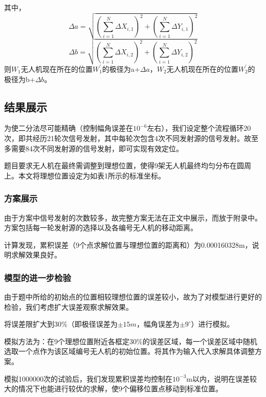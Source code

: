 \documentclass{ctexart}
\begin{document}
其中，
\[
  \Delta a=\sqrt{(\sum_{i=1}^{N}\Delta X_{i,1})^2+(\sum_{i=1}^{N}\Delta Y_{i,1})^2}
\]
\[
  \Delta b=\sqrt{(\sum_{i=1}^{N}\Delta X_{i,2})^2+(\sum_{i=1}^{N}\Delta Y_{i,2})^2}
\]
则$W_1$无人机现在所在的位置$W_1^{'}$的极径为a+$\Delta a$，$W_2$无人机现在所在的位置$W_2^{'}$的极径为b+$\Delta b$。
\subsection{结果展示}
为使二分法尽可能精确（控制幅角误差在$10^{-6}$左右），我们设定整个流程循环20次，即共经历21轮次信号发射，其中每轮次包含4次不同发射源的信号发射。故至多需要84次不同发射源的信号发射，即可实现有效定位。

题目要求无人机在最终需调整到理想位置，使得9架无人机最终均匀分布在圆周上。本文将理想位置设定为如表1所示的标准坐标。
\subsubsection{方案展示}
由于方案中信号发射的次数较多，故完整方案无法在正文中展示，而放于附录中。方案包括每一轮发射源的选择以及各编号无人机的移动距离。

计算发现，累积误差（9个点求解位置与理想位置的距离和）为0.000160328m，说明求解效果良好。

\subsubsection{模型的进一步检验}
由于题中所给的初始点的位置相较理想位置的误差较小，故为了对模型进行更好的检验，我们考虑扩大误差观察求解效果。

将误差限扩大到30\%（即极径误差为$\pm 15m $，幅角误差为$\pm 9^{\circ}$）进行模拟。

模拟方法为：在9个理想位置附近各框定30\%的误差区域，每一个误差区域中随机选取一个点作为该区域编号无人机的初始位置。将其作为输入代入求解具体调整方案。

模拟1000000次的试验后，我们发现累积误差均控制在$10^{-3}$m以内，说明在误差较大的情况下也能进行较优的求解，使9个偏移位置点移动到标准位置。









  
\end{document}
